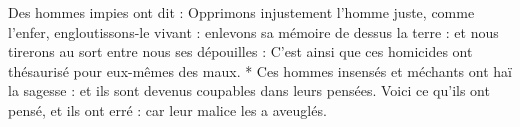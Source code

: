 Des hommes impies ont dit : Opprimons injustement l’homme juste, comme l’enfer, engloutissons-le vivant : enlevons sa mémoire de dessus la terre : et nous tirerons au sort entre nous ses dépouilles : C’est ainsi que ces homicides ont thésaurisé pour eux-mêmes des maux.
\versseparator
* Ces hommes insensés et méchants ont haï la sagesse : et ils sont devenus coupables dans leurs pensées.
\versseparator
Voici ce qu’ils ont pensé, et ils ont erré : car leur malice les a aveuglés.
